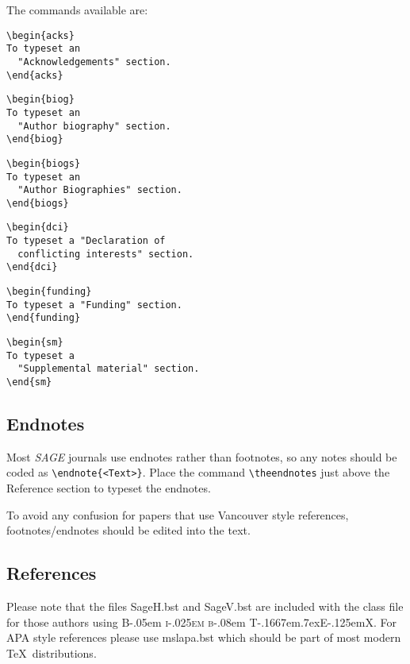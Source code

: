 \documentclass[Afour,sageh,times,doublespace]{sagej}
\newcommand\BibTeX{{\rmfamily B\kern-.05em \textsc{i\kern-.025em b}\kern-.08em
T\kern-.1667em\lower.7ex\hbox{E}\kern-.125emX}}
\begin{document}
The commands available are:
\begin{verbatim}
\begin{acks}
To typeset an
  "Acknowledgements" section.
\end{acks}
\end{verbatim}
\begin{verbatim}
\begin{biog}
To typeset an
  "Author biography" section.
\end{biog}
\end{verbatim}
\begin{verbatim}
\begin{biogs}
To typeset an
  "Author Biographies" section.
\end{biogs}
\end{verbatim}
\begin{verbatim}
\begin{dci}
To typeset a "Declaration of
  conflicting interests" section.
\end{dci}
\end{verbatim}
\begin{verbatim}
\begin{funding}
To typeset a "Funding" section.
\end{funding}
\end{verbatim}
\begin{verbatim}
\begin{sm}
To typeset a
  "Supplemental material" section.
\end{sm}
\end{verbatim}

\subsection{Endnotes}
Most \textit{SAGE} journals use endnotes rather than footnotes, so any notes should be coded as \verb+\endnote{<Text>}+.
Place the command \verb+\theendnotes+ just above the Reference section to typeset the endnotes.

To avoid any confusion for papers that use Vancouver style references,  footnotes/endnotes should be edited into the text.

\subsection{References}
Please note that the files \textsf{SageH.bst} and \textsf{SageV.bst} are included with the class file
for those authors using \BibTeX. For APA style references please use \textsf{mslapa.bst} which should be part of most modern \TeX\ distributions.
\end{document}
